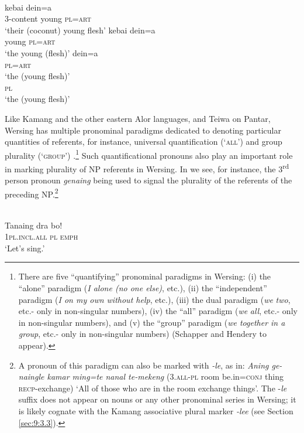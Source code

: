 \ea%
\label{ex:9:57}
 \\
\ea
{}    kebai dein=a\\
3-content young \textsc{pl=art}  \\
\glt `their (coconut) young flesh'
\ex
\gll kebai dein=a   \\
   young \textsc{pl=art}  \\
\glt `the young (flesh)'
\glt
\ex
\gll dein=a   \\
   \textsc{pl=art}  \\
\glt  `the (young flesh)'
\ex
{}\\
    \textsc{pl}\\
\glt  `the (young flesh)'
\z
\z




Like Kamang and the other eastern Alor languages, and Teiwa on Pantar, Wersing has multiple pronominal paradigms dedicated to denoting particular quantities of referents, for instance, universal quantification (`\textsc{all')}  and group plurality (`\textsc{group}') .\footnote{  There are five ``quantifying'' pronominal paradigms in Wersing: (i) the ``alone'' paradigm (\textit{I alone (no one else)}, etc.), (ii) the ``independent'' paradigm (\textit{I on my own without help}, etc.), (iii) the dual paradigm (\textit{we} \textit{two}, etc.- only in non-singular numbers), (iv) the ``all'' paradigm (\textit{we} \textit{all}, etc.- only in non-singular numbers), and (v) the ``group'' paradigm (\textit{we together in a group}, etc.- only in non-singular numbers) (Schapper and Hendery to appear).} Such quantificational pronouns also play an important role in marking plurality of NP referents in Wersing. In  we see, for instance, the 3\textsuperscript{rd} person pronoun \textit{genaing} being
used to signal the plurality of the referents of the preceding NP.\footnote{  A pronoun of this paradigm can also be marked with \textit{-le}, as in: \textit{Aning ge-naingle kamar ming=te nanal te-mekeng} (\textsc{3.all-pl} room be.in=\textsc{conj} thing \textsc{recp}-exchange) `All of those who are in the room exchange things'. The -\textit{le} suffix does not appear on nouns or any other pronominal series in Wersing; it is likely cognate with the Kamang associative plural marker \textit{-lee} (see Section \ref{sec:9:3.3}).}


\ea%
\label{ex:9:58}
 \\
\gll  Tanaing dra bo! \\
   \textsc{1pl.incl.all} \textsc{pl}   \textsc{emph}  \\
\glt `Let's sing.'
\z







